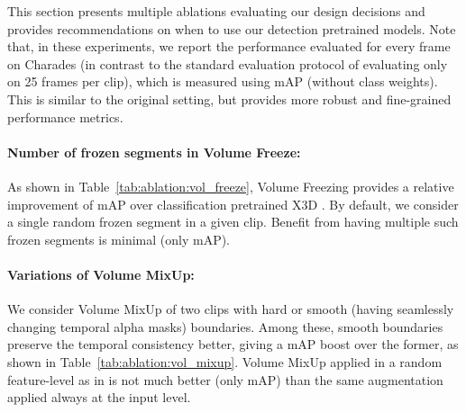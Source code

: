 \documentclass[letterpaper]{article} \usepackage{aaai23}  \usepackage{times}  \usepackage{helvet}  \usepackage{courier}  \usepackage[hyphens]{url}  \usepackage{graphicx} \urlstyle{rm} \def\UrlFont{\rm}  \usepackage{natbib}  \usepackage{caption} \frenchspacing  \setlength{\pdfpagewidth}{8.5in}  \setlength{\pdfpageheight}{11in}  \usepackage{algorithm}
\newcommand{\tref}[1]{Table~\ref{#1}}
\begin{document}
\begin{table*}[t!]
		
		\caption{\textbf{Derailed ablations on Charades} \cite{sigurdsson2016hollywood} \textbf{activity detection}, evaluating our design choices and showing when our detection pretrained models can be most beneficial (i.e., relative improvement from detection pretrained models are not as much as their counterparts at different temporal resolutions (\tref{tab:ablation:downsampling}) or strong temporal aggregation (\tref{tab:ablation:feat-agg})). Here, We show the performance in mean Average Precision (mAP) for fine-grained predictions (i.e., making decisions per every frame rather than evenly-sampled 25 frames from each validation clip). Relative changes of \textcolor{neg}{negative}, \textcolor{smpos}{postive-but-small} and \textcolor{pos}{postive} are shown in corresponding color, whereas the best performances that we highlight are \underline{underlined}. 
		}
		\label{tab:ablations}
\end{table*}
	
This section presents multiple ablations evaluating our design decisions and provides recommendations on when to use our detection pretrained models. Note that, in these experiments, we report the performance evaluated for every frame on Charades \cite{sigurdsson2016hollywood} (in contrast to the standard evaluation protocol of evaluating only on 25 frames per clip), which is measured using mAP (without class weights). This is similar to the original setting, but provides more robust and fine-grained performance metrics.

\paragraph{Number of frozen segments in Volume Freeze:} As shown in \tref{tab:ablation:vol_freeze}, Volume Freezing provides a relative improvement of  mAP over classification pretrained X3D \cite{feichtenhofer2020x3d}. By default, we consider a single random frozen segment in a given clip. Benefit from having multiple such frozen segments is minimal (only   mAP).

\paragraph{Variations of Volume MixUp:} We consider Volume MixUp of two clips with hard or smooth (having seamlessly changing temporal alpha masks) boundaries. Among these, smooth boundaries preserve the temporal consistency better, giving a  mAP boost over the former, as shown in \tref{tab:ablation:vol_mixup}. Volume MixUp applied in a random feature-level as in \cite{verma2019manifold} is not much better (only   mAP) than the same augmentation applied always at the input level.
\end{document}
